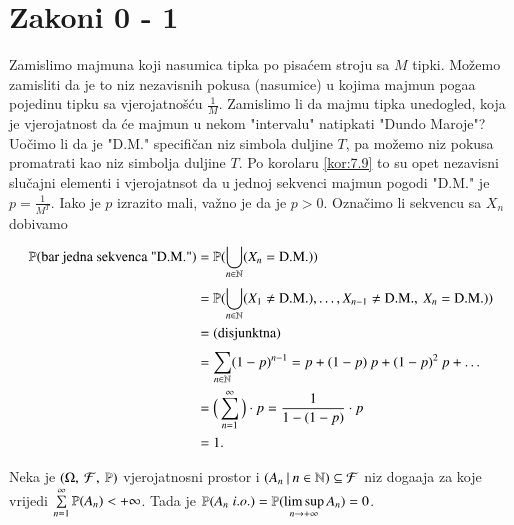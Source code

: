 
\chapter{Zakoni 0 - 1}

\begin{pr}  \label{pr:9.1}
    Zamislimo majmuna koji nasumica tipka po pisa\' cem stroju sa $M$ tipki.
    Mo\v zemo zamisliti da je to niz nezavisnih pokusa (nasumice) u kojima majmun poga\dj a pojedinu tipku sa vjerojatno\v s\' cu $\frac{1}{M}$.
    Zamislimo li da majmu tipka unedogled, koja je vjerojatnost da \' ce majmun u nekom "intervalu" natipkati "Dundo Maroje"?
    Uo\v cimo li da je "D.M." specifi\v can niz simbola duljine $T$, pa mo\v zemo niz pokusa promatrati kao niz simbolja duljine $T$.
    Po korolaru \ref{kor:7.9} to su opet nezavisni slu\v cajni elementi i vjerojatnsot da u jednoj sekvenci majmun pogodi "D.M." je $p = \frac{1}{M^T}$.
    Iako je $p$ izrazito mali, va\v zno je da je $p > 0$.
    Ozna\v cimo li sekvencu sa $X_n$ dobivamo
    \begin{equation*}
        \begin{aligned}
            \mathbb{P}({\textnormal{bar jedna sekvenca "D.M."}})
            &= \mathbb{P}({\bigcup\limits_{n \in \mathbb{N}}^{} (X_n = \textnormal{D.M.})})\\
            &= \mathbb{P}({\bigcup\limits_{n \in \mathbb{N}}^{} (X_1 \neq \textnormal{D.M.}), \ldots, X_{n-1} \neq \textnormal{D.M.}, \: X_n = \textnormal{D.M.})})\\
            &= \textnormal{(disjunktna)}\\
            &= \sum\limits_{n \in \mathbb{N}}^{} (1 - p)^{n - 1} = p + (1 - p) \: p + (1 - p)^2 \: p + \ldots\\
            &= \Big( \sum\limits_{n = 1}^{\infty} \Big) \cdot p = \frac{1}{1 - (1 - p)} \cdot p\\
            &= 1.
        \end{aligned}
    \end{equation*}
\end{pr}

\begin{lm}  \label{lm:9.2}
    Neka je $(\Omega, \: \mathcal{F}, \: \mathbb{P})$ vjerojatnosni prostor i $({A_n} \: | \: {n \in \mathbb{N}}) \subseteq \mathcal{F}$ niz doga\dj aja za koje vrijedi $\sum\limits_{n = 1}^{\infty} \mathbb{P}({A_n}) < +\infty$.
    Tada je $\mathbb{P}({A_n \; i.o.}) = \mathbb{P}({\limsup\limits_{n \to +\infty} A_n}) = 0$.
\end{lm}

